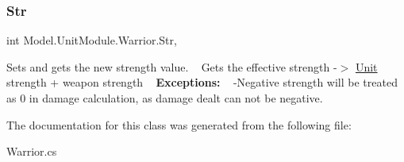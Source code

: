 \subsubsection{\texorpdfstring{Str}{Str}}
{\footnotesize\ttfamily int Model.\+Unit\+Module.\+Warrior.\+Str\hspace{0.3cm}{\ttfamily [get]}, {\ttfamily [set]}}

Sets and gets the new strength value. ~\newline
 Gets the effective strength -\/$>$ \hyperlink{interface_model_1_1_unit_module_1_1_unit}{Unit} strength + weapon strength ~\newline
 {\bfseries Exceptions\+:} ~\newline
 -\/\+Negative strength will be treated as 0 in damage calculation, as damage dealt can not be negative. 

The documentation for this class was generated from the following file\+:\begin{DoxyCompactItemize}
\item 
Warrior.\+cs\end{DoxyCompactItemize}
